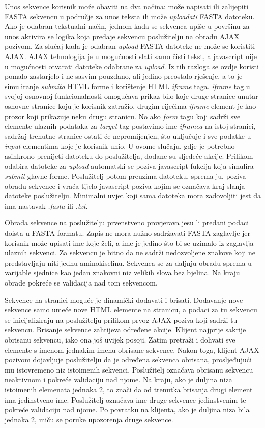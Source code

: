Unos sekvence korisnik može obaviti na dva načina: može napisati ili zalijepiti
FASTA sekvencu u područje za unos teksta ili može \emph{uploadati} FASTA
datoteku. Ako je odabran tekstualni način, jednom kada se sekvenca upiše u
površinu za unos aktivira se logika koja predaje sekvencu poslužitelju na obradu
AJAX pozivom. Za slučaj kada je odabran \emph{upload} FASTA datoteke ne može se
koristiti AJAX. AJAX tehnologija je u mogućnosti slati samo čisti tekst, a
javascript nije u mogućnosti otvarati datoteke odabrane za \emph{upload}. Iz tih
razloga se ovdje koristi pomalo zastarjelo i ne sasvim pouzdano, ali jedino
preostalo rješenje, a to je simuliranje \emph{submita} HTML forme i korištenje
HTML \emph{iframe} taga. \emph{iframe} tag u svojoj osnovnoj funkcionalnosti
omogućava prikaz bilo koje druge stranice unutar osnovne stranice koju je
korisnik zatražio, drugim riječima \emph{iframe} element je kao prozor koji
prikazuje neku drugu stranicu. No ako \emph{form} tagu koji sadrži sve elemente
ulaznih podataka za \emph{target} tag postavimo ime \emph{iframea} na istoj
stranici, sadržaj trenutne stranice ostati će nepromijenjen, što uključuje i sve
podatke u \emph{input} elementima koje je korisnik unio. U ovome slučaju, gdje
je potrebno asinkrono prenijeti datoteku do poslužitelja, dodane su sljedeće
akcije. Prilikom odabira datoteke za \emph{upload} automatski se poziva
javascript fukcija koja simulira \emph{submit} glavne forme. Poslužitelj potom
preuzima datoteku, sprema ju, poziva obradu sekvence i vraća tijelo javascript
poziva kojim se označava kraj slanja datoteke poslužitelju. Minimalni uvjet koji
sama datoteka mora zadovoljiti jest da ima nastavak \emph{.fasta} ili
\emph{.txt}.

Obrada sekvence na poslužitelju prvenstveno provjerava jesu li predani podaci
doista u FASTA formatu. Zapis ne mora nužno sadržavati FASTA zaglavlje jer
korisnik može upisati ime koje želi, a ime je jedino što bi se uzimalo iz
zaglavlja ulaznih sekvenci. Za sekvencu je bitno da ne sadrži nedozvoljene
znakove koji ne predstavljaju niti jednu aminokiselinu. Sekvenca se za daljnju
obradu sprema u varijable sjednice kao jedan znakovni niz velikih slova bez
bjelina. Na kraju obrade pokreće se validacija nad tom sekvencom.

Sekvence na stranici moguće je dinamički dodavati i brisati. Dodavanje nove
sekvence samo umeće nove HTML elemente na stranicu, a podaci za tu sekvencu se
inicijaliziraju na poslužitelju prilikom prvog AJAX poziva koji sadrži tu
sekvencu. Brisanje sekvence zahtijeva određene akcije. Klijent najprije sakrije
obrisanu sekvencu, iako ona još uvijek posoji. Zatim pretraži i dohvati sve
elemente s imenom jednakim imenu obrisane sekvence. Nakon toga, klijent AJAX
pozivom dojavljuje poslužitelju da je određena sekvenca obrisana, prosljeđujući
mu istovremeno niz istoimenih sekvenci. Poslužitelj označava obrisanu sekvencu
neaktivnom i pokreće validaciju nad njome. Na kraju, ako je duljina niza
istoimenih elemenata jednaka 2, to znači da od trenutka brisanja drugi element
ima jedinstveno ime. Poslužitelj označava ime druge sekvence jedinstvenim te
pokreće validaciju nad njome. Po povratku na klijenta, ako je duljina niza bila
jednaka 2, miču se poruke upozorenja druge sekvence.

